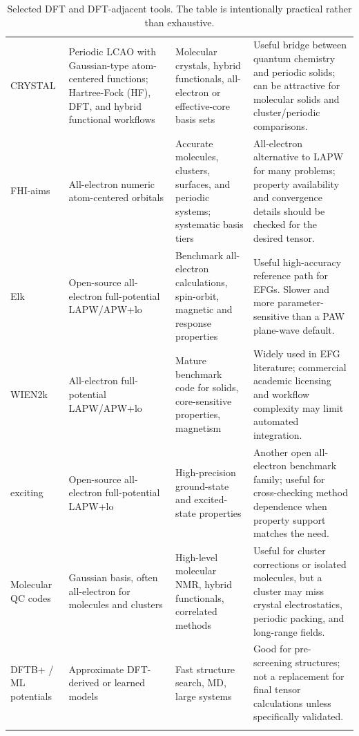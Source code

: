 \documentclass[11pt]{article}
\begin{document}
\begin{longtable}{@{}L{0.14\textwidth}L{0.22\textwidth}L{0.25\textwidth}L{0.29\textwidth}@{}}
CRYSTAL & Periodic LCAO with Gaussian-type atom-centered functions; Hartree-Fock (HF), DFT, and hybrid functional workflows & Molecular crystals, hybrid functionals, all-electron or effective-core basis sets & Useful bridge between quantum chemistry and periodic solids; can be attractive for molecular solids and cluster/periodic comparisons. \\
FHI-aims & All-electron numeric atom-centered orbitals & Accurate molecules, clusters, surfaces, and periodic systems; systematic basis tiers & All-electron alternative to LAPW for many problems; property availability and convergence details should be checked for the desired tensor. \\
Elk & Open-source all-electron full-potential LAPW/APW+lo & Benchmark all-electron calculations, spin-orbit, magnetic and response properties & Useful high-accuracy reference path for EFGs.  Slower and more parameter-sensitive than a PAW plane-wave default. \\
WIEN2k & All-electron full-potential LAPW/APW+lo & Mature benchmark code for solids, core-sensitive properties, magnetism & Widely used in EFG literature; commercial academic licensing and workflow complexity may limit automated integration. \\
exciting & Open-source all-electron full-potential LAPW+lo & High-precision ground-state and excited-state properties & Another open all-electron benchmark family; useful for cross-checking method dependence when property support matches the need. \\
Molecular QC codes & Gaussian basis, often all-electron for molecules and clusters & High-level molecular NMR, hybrid functionals, correlated methods & Useful for cluster corrections or isolated molecules, but a cluster may miss crystal electrostatics, periodic packing, and long-range fields. \\
DFTB+ / ML potentials & Approximate DFT-derived or learned models & Fast structure search, MD, large systems & Good for pre-screening structures; not a replacement for final tensor calculations unless specifically validated. \\
\bottomrule
\caption{Selected DFT and DFT-adjacent tools.  The table is intentionally practical rather than exhaustive.}
\label{tab:codes}
\end{longtable}
\end{document}
